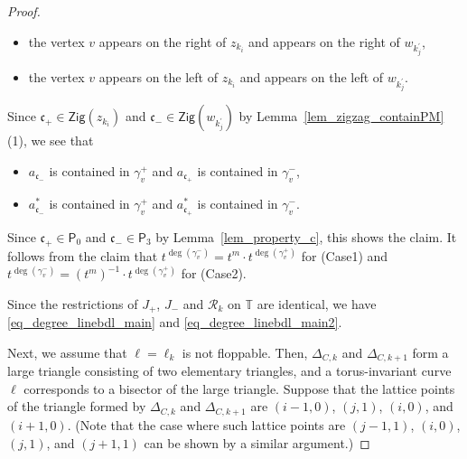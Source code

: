 \documentclass[pdftex]{sigma}
\numberwithin{equation}{section}
\theoremstyle{definition}
\newcommand{\TT}{\mathbb{T}}
\newcommand{\calR}{\mathcal{R}}
\newcommand{\fkc}{\mathfrak{c}}
\newcommand{\sfP}{\mathsf{P}}
\newcommand{\Zig}{\mathsf{Zig}}
\begin{document}
\begin{proof}
\begin{itemize}
\begin{itemize}\setlength{\leftskip}{1cm}\itemsep=0pt
\item[(Case 1)] the vertex $v$ appears on the right of $z_{k_i}$ and appears on the right of $w_{k_j^\prime}$,
\item[(Case 2)] the vertex $v$ appears on the left of $z_{k_i}$ and appears on the left of $w_{k_j^\prime}$.
\end{itemize}
Since $\fkc_+\in\Zig(z_{k_i})$ and $\fkc_-\in\Zig(w_{k^\prime_j})$ by Lemma~\ref{lem_zigzag_containPM}(1),
we see that
\begin{itemize}\setlength{\leftskip}{1cm}\itemsep=0pt
\item[(Case 1)] $a_{\fkc_-}$ is contained in $\gamma_v^+$ and $a_{\fkc_+}$ is contained in $\gamma_v^-$,
\item[(Case 2)] $a_{\fkc_-}^*$ is contained in $\gamma_v^+$ and $a_{\fkc_+}^*$ is contained in $\gamma_v^-$.
\end{itemize}
Since $\fkc_+\in\sfP_0$ and $\fkc_-\in\sfP_3$ by Lemma~\ref{lem_property_c}, this shows the claim.
It follows from the claim that
$t^{\deg(\gamma^-_v)}=t^m\cdot t^{\deg(\gamma^+_v)}$ for (Case1) and $t^{\deg(\gamma^-_v)}=(t^m)^{-1}\cdot t^{\deg(\gamma^+_v)}$ for (Case2).
\end{itemize}
Since the restrictions of $J_+$, $J_-$ and $\calR_k$ on $\TT$ are identical,
we have \eqref{eq_degree_linebdl_main} and \eqref{eq_degree_linebdl_main2}.

Next, we assume that $\ell=\ell_k$ is not floppable.
Then, $\Delta_{C,k}$ and $\Delta_{C,k+1}$ form a large triangle consisting of two elementary triangles,
and a torus-invariant curve $\ell$ corresponds to a bisector of the large triangle.
Suppose that the lattice points of the triangle formed by $\Delta_{C,k}$ and $\Delta_{C,k+1}$ are $(i-1,0)$, $(j,1)$, $(i,0)$, and $(i+1,0)$.
(Note that the case where such lattice points are $(j-1,1)$, $(i,0)$, $(j,1)$, and $(j+1,1)$ can be shown by a similar argument.)


\end{proof}
\end{document}
